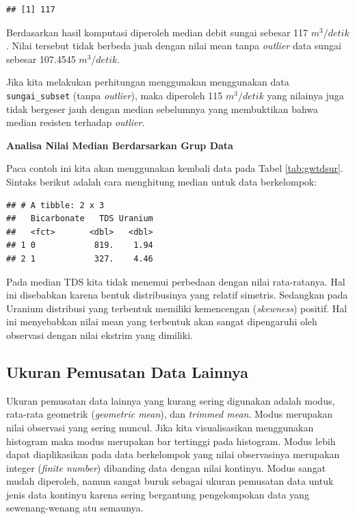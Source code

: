 \documentclass[]{book}
\newenvironment{Shaded}{\begin{snugshade}}{\end{snugshade}}
\newcommand{\KeywordTok}[1]{\textcolor[rgb]{0.13,0.29,0.53}{\textbf{#1}}}
\newcommand{\DataTypeTok}[1]{\textcolor[rgb]{0.13,0.29,0.53}{#1}}
\newcommand{\StringTok}[1]{\textcolor[rgb]{0.31,0.60,0.02}{#1}}
\newcommand{\OperatorTok}[1]{\textcolor[rgb]{0.81,0.36,0.00}{\textbf{#1}}}
\newcommand{\NormalTok}[1]{#1}
\begin{document}
\begin{verbatim}
## [1] 117
\end{verbatim}

Berdasarkan hasil komputasi diperoleh median debit sungai sebesar 117
\(m^3/detik\). Nilai tersebut tidak berbeda juah dengan nilai mean tanpa
\emph{outlier} data sungai sebesar 107.4545 \(m^3/detik\).

Jika kita melakukan perhitungan menggunakan menggunakan data
\texttt{sungai\_subset} (tanpa \emph{outlier}), maka diperoleh 115
\(m^3/detik\) yang nilainya juga tidak bergeser jauh dengan median
sebelumnya yang membuktikan bahwa median resisten terhadap
\emph{outlier}.

\textbf{Analisa Nilai Median Berdarsarkan Grup Data}

Paca contoh ini kita akan menggunakan kembali data pada Tabel
\ref{tab:gwtdsur}. Sintaks berikut adalah cara menghitung median untuk
data berkelompok:

\begin{Shaded}
\end{Shaded}

\begin{verbatim}
## # A tibble: 2 x 3
##   Bicarbonate   TDS Uranium
##   <fct>       <dbl>   <dbl>
## 1 0            819.    1.94
## 2 1            327.    4.46
\end{verbatim}

Pada median TDS kita tidak menemui perbedaan dengan nilai rata-ratanya.
Hal ini disebabkan karena bentuk distribusinya yang relatif simetris.
Sedangkan pada Uranium distribusi yang terbentuk memiliki kemencengan
(\emph{skewness}) positif. Hal ini menyebabkan nilai mean yang terbentuk
akan sangat dipengaruhi oleh observasi dengan nilai ekstrim yang
dimiliki.

\subsection{Ukuran Pemusatan Data
Lainnya}\label{ukuran-pemusatan-data-lainnya}

Ukuran pemusatan data lainnya yang kurang sering digunakan adalah modus,
rata-rata geometrik (\emph{geometric mean}), dan \emph{trimmed mean}.
Modus merupakan nilai observasi yang sering muncul. Jika kita
visualisasikan menggunakan histogram maka modus merupakan bar tertinggi
pada histogram. Modus lebih dapat diaplikasikan pada data berkelompok
yang nilai observasinya merupakan integer (\emph{finite number})
dibanding data dengan nilai kontinyu. Modus sangat mudah diperoleh,
namun sangat buruk sebagai ukuran pemusatan data untuk jenis data
kontinyu karena sering bergantung pengelompokan data yang
sewenang-wenang atu semaunya.
\end{document}
